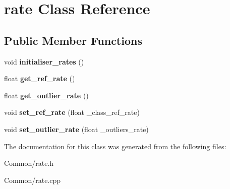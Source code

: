 \hypertarget{classrate}{
\section{rate Class Reference}
\label{classrate}
}
\subsection*{Public Member Functions}
\begin{DoxyCompactItemize}
\item 
\hypertarget{classrate_aeb21eeed7d4bd33679e1dc0470c62cb2}{
void {\bfseries initialiser\_\-rates} ()}
\label{classrate_aeb21eeed7d4bd33679e1dc0470c62cb2}

\item 
\hypertarget{classrate_a0c5b29cb184c0c64fd5b4455c15a6fd2}{
float {\bfseries get\_\-ref\_\-rate} ()}
\label{classrate_a0c5b29cb184c0c64fd5b4455c15a6fd2}

\item 
\hypertarget{classrate_a0a970d76d73e9948a8710f46b6975ad9}{
float {\bfseries get\_\-outlier\_\-rate} ()}
\label{classrate_a0a970d76d73e9948a8710f46b6975ad9}

\item 
\hypertarget{classrate_a418c984a1fe780c4999c3eadbef915cd}{
void {\bfseries set\_\-ref\_\-rate} (float \_\-class\_\-ref\_\-rate)}
\label{classrate_a418c984a1fe780c4999c3eadbef915cd}

\item 
\hypertarget{classrate_ae2f493ca89aab46ed67c718cbf603013}{
void {\bfseries set\_\-outlier\_\-rate} (float \_\-outliers\_\-rate)}
\label{classrate_ae2f493ca89aab46ed67c718cbf603013}

\end{DoxyCompactItemize}


The documentation for this class was generated from the following files:\begin{DoxyCompactItemize}
\item 
Common/rate.h\item 
Common/rate.cpp\end{DoxyCompactItemize}
